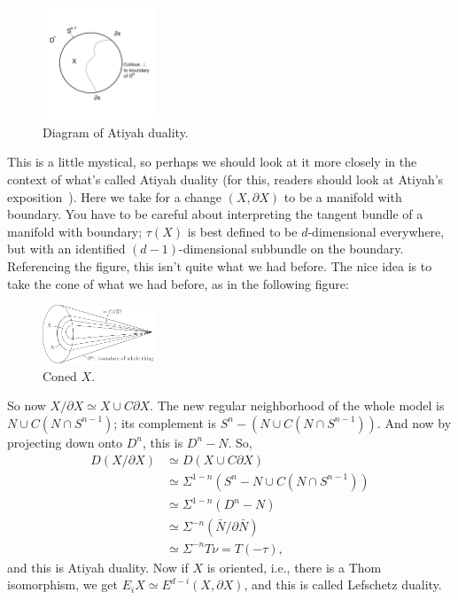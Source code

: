\documentclass{article}
\newcommand{\Suspend}{\Sigma}
\begin{document}
\begin{figure}
\centering\includegraphics[width=0.3\textwidth]{figures/28.pdf}
\caption{\small Diagram of Atiyah duality.}
\end{figure}
This is a little mystical, so perhaps we should look at it more closely in the context of what's called Atiyah duality (for this, readers should look at Atiyah's exposition~\cite{Atiyah}).  Here we take for a change $(X, \partial X)$ to be a manifold with boundary.  You have to be careful about interpreting the tangent bundle of a manifold with boundary; $\tau(X)$ is best defined to be $d$-dimensional everywhere, but with an identified $(d-1)$-dimensional subbundle on the boundary.  Referencing the figure, this isn't quite what we had before.  The nice idea is to take the cone of what we had before, as in the following figure:
\begin{figure}[h!]
\centering\includegraphics[width=0.3\textwidth]{figures/figure29.pdf}
\caption{\small Coned $X$.}
\end{figure}

So now $X / \partial X \simeq X \cup C \partial X$.  The new regular neighborhood of the whole model is $N \cup C(N \cap S^{n-1})$; its complement is $S^n - (N \cup C(N \cap S^{n-1}))$.  And now by projecting down onto $D^n$, this is $D^n - N$.  So,
\begin{align*}
D(X / \partial X) & \simeq D(X \cup C \partial X) \\
& \simeq \Suspend^{1-n}(S^n - N \cup C(N \cap S^{n-1})) \\
& \simeq \Suspend^{1-n}(D^n - N) \\
& \simeq \Suspend^{-n}(\bar N / \partial \bar N) \\
& \simeq \Suspend^{-n} T \nu = T(-\tau),
\end{align*}
and this is Atiyah duality.  Now if $X$ is oriented, i.e., there is a Thom isomorphism, we get $E_i X \simeq E^{d-i}(X, \partial X)$, and this is called Lefschetz duality.
\end{document}
